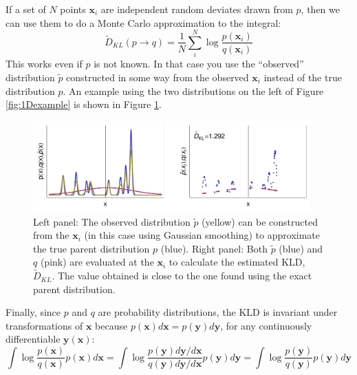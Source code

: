 \documentclass[useAMS,usenatbib,a4paper,referee]{mn2e}
\begin{document}
If a set of $N$ points $\mathbf{x}_i$ are independent random deviates drawn from $p$, then we can use them to do a Monte Carlo approximation to the integral:
\begin{equation}
  \tilde{D}_{KL}(p\to q) = \frac{1}{N} \sum_{i}^{N} \log \frac{p(\mathbf{x}_i)}{q(\mathbf{x}_i)}
\end{equation}
This works even if $p$ is not known. In that case you use the ``observed'' distribution $\tilde{p}$ constructed in some way from the observed $\mathbf{x}_i$ instead of the true distribution $p$. An example using the two distributions on the left of Figure \ref{fig:1Dexample} is shown in Figure \ref{fig:monteCarlo}.
\begin{figure}
 \includegraphics[width=0.95\textwidth]{monteCarlo}
\caption{Left panel: The observed distribution $\tilde{p}$ (yellow) can be constructed from the $\mathbf{x}_i$ (in this case using Gaussian smoothing) to approximate the true parent distribution $p$ (blue). Right panel: Both $\tilde{p}$ (blue) and $q$ (pink) are evaluated at the $\mathbf{x}_i$ to calculate the estimated KLD, $\tilde{D}_{KL}$. The value obtained is close to the one found using the exact parent distribution.}
\label{fig:monteCarlo}
\end{figure}

Finally, since $p$ and $q$ are probability distributions, the KLD is invariant under transformations of $\mathbf{x}$ because $p(\mathbf{x}) d\mathbf{x} = p(\mathbf{y}) d\mathbf{y}$, for any continuously differentiable $\mathbf{y}(\mathbf{x})$:
\begin{equation}
  \int  \log \frac{p(\mathbf{x})}{q(\mathbf{x})} p(\mathbf{x}) d\mathbf{x} = \int \log \frac{p(\mathbf{y}) d\mathbf{y}/d\mathbf{x}}{q(\mathbf{y})d\mathbf{y}/d\mathbf{x}} p(\mathbf{y}) d\mathbf{y} =  \int  \log \frac{p(\mathbf{y})}{q(\mathbf{y})} p(\mathbf{y}) d\mathbf{y} 
\end{equation}
\end{document}
